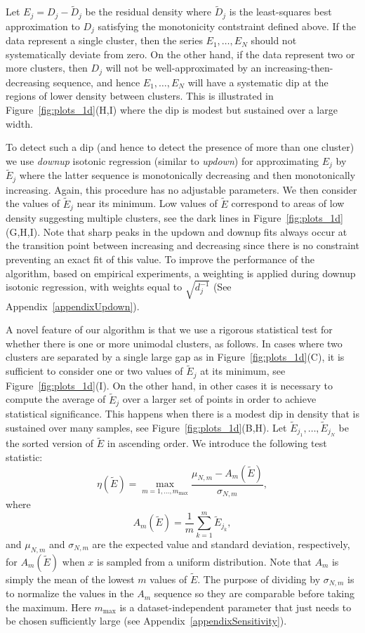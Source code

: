 \documentclass[10pt]{article}
\begin{document}
Let $E_j=D_j-\tilde{D}_j$ be the residual density where $\tilde{D}_j$ is the least-squares best approximation to $D_j$ satisfying the monotonicity contstraint defined above. If the data represent a single cluster, then the series $E_1,\dots,E_N$ should not systematically deviate from zero. On the other hand, if the data represent two or more clusters, then $D_j$ will not be well-approximated by an increasing-then-decreasing sequence, and hence $E_1,\dots,E_N$ will have a systematic dip at the regions of lower density between clusters. This is illustrated in Figure~\ref{fig:plots_1d}(H,I) where the dip is modest but sustained over a large width.

To detect such a dip (and hence to detect the presence of more than one cluster) we use \emph{downup} isotonic regression (similar to \emph{updown}) for approximating $E_j$ by $\tilde{E}_j$ where the latter sequence is monotonically decreasing and then monotonically increasing. Again, this procedure has no adjustable parameters. We then consider the values of $\tilde{E}_j$ near its minimum. Low values of $\tilde{E}$ correspond to areas of low density suggesting multiple clusters, see the dark lines in Figure~\ref{fig:plots_1d}(G,H,I). Note that sharp peaks in the updown and downup fits always occur at the transition point between increasing and decreasing since there is no constraint preventing an exact fit of this value. To improve the performance of the algorithm, based on empirical experiments, a weighting is applied during downup isotonic regression, with weights equal to $\sqrt{d_j^{-1}}$ (See Appendix~\ref{appendixUpdown}).

A novel feature of our algorithm is that we use a rigorous statistical test for whether there is one or more unimodal clusters, as follows.
In cases where two clusters are separated by a single large gap as in Figure~\ref{fig:plots_1d}(C), it is sufficient to consider one or two values of $\tilde{E}_j$ at its minimum, see Figure~\ref{fig:plots_1d}(I). On the other hand, in other cases it is necessary to compute the average of $\tilde{E}_j$ over a larger set of points in order to achieve statistical significance. This happens when there is a modest dip in density that is sustained over many samples, see Figure~\ref{fig:plots_1d}(B,H). Let $\tilde{E}_{j_1},\dots,\tilde{E}_{j_N}$ be the sorted version of $\tilde{E}$ in ascending order. We introduce the following test statistic:
$$
\label{eq:test_statistic}
\eta(\tilde{E})=\max_{m=1,\dots,m_\text{max}} \frac{\mu_{N,m}-A_m(\tilde{E})}{\sigma_{N,m}},
$$
where
$$A_m(\tilde{E})=\frac{1}{m}\sum_{k=1}^m \tilde{E}_{j_k},$$
and $\mu_{N,m}$ and $\sigma_{N,m}$ are the expected value and standard deviation, respectively, for $A_m(\tilde{E})$ when $x$ is sampled from a uniform distribution. Note that $A_m$ is simply the mean of the lowest $m$ values of $\tilde{E}$. The purpose of dividing by $\sigma_{N,m}$ is to normalize the values in the $A_m$ sequence so they are comparable before taking the maximum. Here $m_\text{max}$ is a dataset-independent parameter that just needs to be chosen sufficiently large (see Appendix~\ref{appendixSensitivity}).
\end{document}
